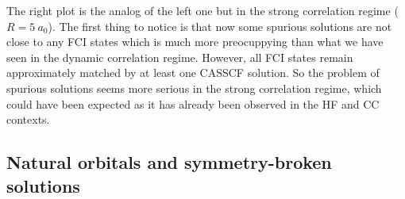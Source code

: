 \documentclass[aps,prb,reprint,showkeys,superscriptaddress]{revtex4-1}
\begin{document}
The right plot is the analog of the left one but in the strong correlation regime ($R=5~a_0$).
The first thing to notice is that now some spurious solutions are not close to any FCI states which is much more preocuppying than what we have seen in the dynamic correlation regime.
However, all FCI states remain approximately matched by at least one CASSCF solution.
So the problem of spurious solutions seems more serious in the strong correlation regime, which could have been expected as it has already been observed in the HF and CC contexts.

\subsection{Natural orbitals and symmetry-broken solutions}
\label{sec:natural}
\end{document}
